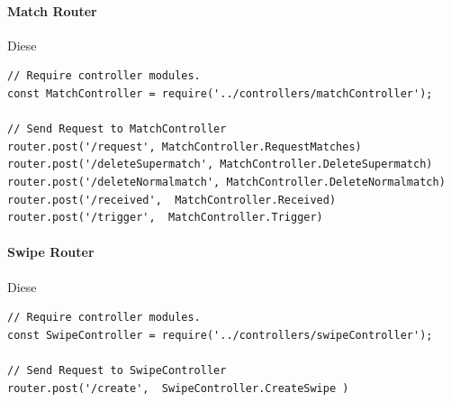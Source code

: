 \paragraph{Match Router}
Diese
\begin{lstlisting}[caption=TODO, label=lst:TODO]
// Require controller modules.
const MatchController = require('../controllers/matchController');

// Send Request to MatchController
router.post('/request', MatchController.RequestMatches)
router.post('/deleteSupermatch', MatchController.DeleteSupermatch)
router.post('/deleteNormalmatch', MatchController.DeleteNormalmatch)
router.post('/received',  MatchController.Received)
router.post('/trigger',  MatchController.Trigger)
\end{lstlisting}


\paragraph{Swipe Router}
Diese
\begin{lstlisting}[caption=TODO, label=lst:TODO]
// Require controller modules.
const SwipeController = require('../controllers/swipeController');

// Send Request to SwipeController
router.post('/create',  SwipeController.CreateSwipe )
\end{lstlisting}









